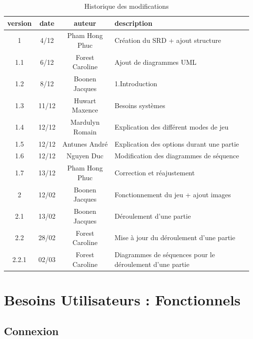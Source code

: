 \documentclass[10pt, a4paper]{article}
\begin{document}
		\begin{table}[h!]

			\centering

			\begin{tabular}{|c|c|c|p{50mm}|}
				\hline
				 \textbf{version} & \textbf{date} & \textbf{auteur}  & \textbf{description} \\ \hline
				 1 & 4/12 & Pham Hong Phuc & Création du SRD + ajout structure\\
				 1.1 & 6/12 & Forest Caroline & Ajout de diagrammes UML\\
				 1.2 & 8/12 & Boonen Jacques & 1.Introduction\\
				 1.3 & 11/12 & Huwart Maxence & Besoins systèmes\\
				 1.4 & 12/12 & Mardulyn Romain & Explication des différent modes de jeu\\
				 1.5 & 12/12 & Antunes André & Explication des options durant une partie\\
         1.6 & 12/12 & Nguyen Duc & Modification des diagrammes de séquence\\
         1.7 & 13/12 & Pham Hong Phuc & Correction et réajustement \\ \hline
				 2 & 12/02 & Boonen Jacques & Fonctionnement du jeu + ajout images \\
				 2.1 & 13/02 & Boonen Jacques & Déroulement d'une partie \\
				 2.2 & 28/02 & Forest Caroline & Mise à jour du déroulement d'une partie \\
				 2.2.1 & 02/03 & Forest Caroline & Diagrammes de séquences pour le déroulement d'une partie \\
				\hline
\end{tabular}
			\caption*{Historique des modifications}
			\end{table}
\clearpage


\section{Besoins Utilisateurs : Fonctionnels}


\subsection{Connexion}
\end{document}
